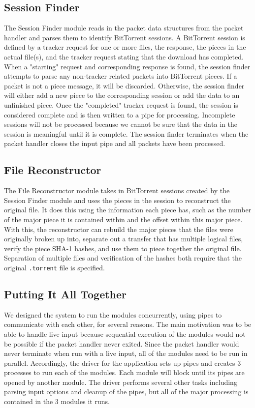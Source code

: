 \documentclass{acm_proc_article-sp}
\begin{document}
\subsection{Session Finder}
The Session Finder module reads in the packet data structures from the packet
handler and parses them to identify BitTorrent sessions. A BitTorrent session is
defined by a tracker request for one or more files, the response, the pieces in
the actual file(s), and the tracker request stating that the download has
completed. When a "starting" request and corresponding response is found, the
session finder attempts to parse any non-tracker related packets into BitTorrent
pieces. If a packet is not a piece message, it will be discarded. Otherwise, the
session finder will either add a new piece to the corresponding session or add
the data to an unfinished piece. Once the "completed" tracker request is found,
the session is considered complete and is then written to a pipe for
processing. Incomplete sessions will not be processed because we cannot be sure
that the data in the session is meaningful until it is complete. The session
finder terminates when the packet handler closes the input pipe and all packets
have been processed.

\subsection{File Reconstructor}
The File Reconstructor module takes in BitTorrent sessions created by the
Session Finder module and uses the pieces in the session to reconstruct the
original file. It does this using the information each piece has, such as the
number of the major piece it is contained within and the offset within this
major piece. With this, the reconstructor can rebuild the major pieces that the
files were originally broken up into, separate out a transfer that has multiple
logical files, verify the piece SHA-1 hashes, and use them to piece together
the original file. Separation of multiple files and verification of the hashes
both require that the original \texttt{.torrent} file is specified.

\subsection{Putting It All Together}
We designed the system to run the modules concurrently, using pipes to
communicate with each other, for several reasons. The main motivation was to be
able to handle live input because sequential execution of the modules would not
be possible if the packet handler never exited. Since the packet handler would
never terminate when run with a live input, all of the modules need to be run in
parallel. Accordingly, the driver for the application sets up pipes and creates
3 processes to run each of the modules. Each module will block until its pipes
are opened by another module. The driver performs several other tasks including
parsing input options and cleanup of the pipes, but all of the major processing
is contained in the 3 modules it runs.
\end{document}
